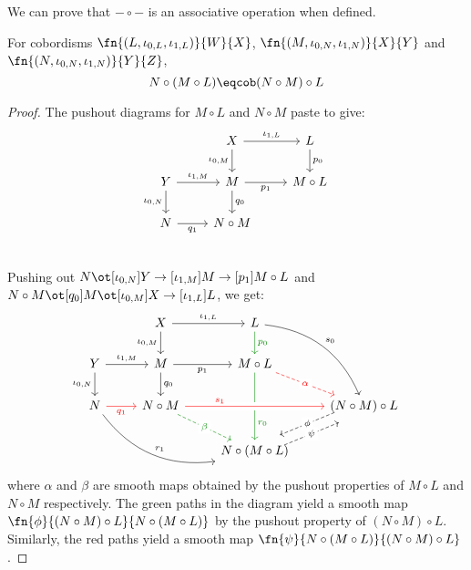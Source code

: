We can prove that $- \circ -$ is an associative operation when defined.
\begin{lem}\label{cobglue:assoc}
For cobordisms $\fn{(L, \iota_{0, L}, \iota_{1, L})}{W}{X}$,
$\fn{(M, \iota_{0, N}, \iota_{1, N})}{X}{Y}$ and
$\fn{(N, \iota_{0, N}, \iota_{1, N})}{Y}{Z}$,
\[
  N \circ (M \circ L) \eqcob (N \circ M) \circ L
\]
\end{lem}
\begin{proof}
The pushout diagrams for $M \circ L$ and $N \circ M$ paste to give:
\[\begin{tikzcd}
  & X \arrow[r, "\iota_{1, L}" above] \arrow[d, "\iota_{0, M}" left]
  & L \arrow[d, "p_0" right] \\
  Y \arrow[r, "\iota_{1, M}" above] \arrow[d, "\iota_{0, N}" left]
  & M \arrow[r, "p_1" below] \arrow[d, "q_0" right]
  & M \circ L \\
  N \arrow[r, "q_1" below]
  & N \circ M & \\
\end{tikzcd}\]

Pushing out $N \ot[\iota_{0, N}] Y \to[\iota_{1, M}] M \to[p_1] M \circ L$
and $N \circ M \ot[q_0] M \ot[\iota_{0, M}] X \to[\iota_{1, L}] L$, we get:
\[\begin{tikzcd}
  & X \arrow[r, "\iota_{1, L}" above] \arrow[d, "\iota_{0, M}" left]
  & L \arrow[d, green!55!black, "p_0" right] \arrow[rdd, bend left, "s_0"] \\
  Y \arrow[r, "\iota_{1, M}" above] \arrow[d, "\iota_{0, N}" left]
  & M \arrow[r, "p_1" below] \arrow[d, "q_0" right]
  & M \circ L \arrow[dd, green!55!black, near end, "r_0"]
      \arrow[rd, dashed, red, "\alpha" description]\\
  N \arrow[r, red, "q_1" below] \arrow[rrd, bend right, "r_1"]
  & N \circ M \arrow[rr, near start, crossing over, red, "s_1"]
      \arrow[rd, dashed, green!55!black, "\beta" description]
  &
  & (N \circ M) \circ L
      \arrow[dl, dashed, shift right=1ex, "\phi" description] \\
  & & N \circ (M \circ L)
      \arrow[ur, dashed, shift right=1ex, "\psi" description] &
\end{tikzcd}\]
where $\alpha$ and $\beta$ are smooth maps obtained by the pushout properties of
$M \circ L$ and $N \circ M$ respectively. The green paths in the diagram yield
a smooth map $\fn{\phi}{(N \circ M) \circ L}{N \circ (M \circ L)}$ by the
pushout property of $(N \circ M) \circ L$. Similarly, the red paths yield a
smooth map $\fn{\psi}{N \circ (M \circ L)}{(N \circ M) \circ L}$.


\end{proof}
